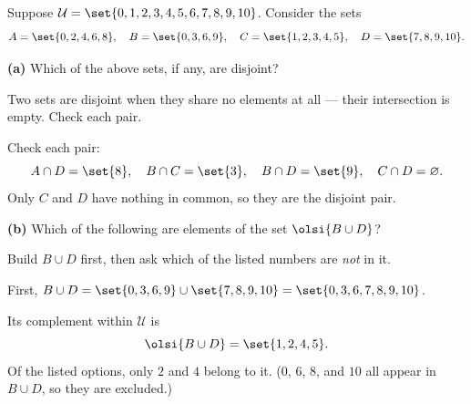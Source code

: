 \documentclass[12pt]{ximera}
\begin{document}
\begin{problem}
Suppose $\mathcal{U}=\set{0,1,2,3,4,5,6,7,8,9,10}$. Consider the sets
\[
A= \set{0,2,4,6,8},\quad B= \set{0,3,6,9},\quad C= \set{1,2,3,4,5},\quad D= \set{7,8,9,10}.
\]

\begin{prompt}
\textbf{(a)} Which of the above sets, if any, are disjoint?

\begin{multipleChoice}
\end{multipleChoice}

\begin{hint}
Two sets are disjoint when they share no elements at all --- their intersection is
empty. Check each pair.
\end{hint}

\begin{feedback}
Check each pair:
\[
A\cap D=\set{8},\quad B\cap C=\set{3},\quad B\cap D=\set{9},\quad C\cap D=\varnothing.
\]
Only $C$ and $D$ have nothing in common, so they are the disjoint pair.
\end{feedback}
\end{prompt}

\begin{prompt}
\textbf{(b)} Which of the following are elements of the set $\olsi{B\cup D}$?

\begin{selectAll}
\end{selectAll}

\begin{hint}
Build $B\cup D$ first, then ask which of the listed numbers are \emph{not} in it.
\end{hint}

\begin{feedback}
First, $B\cup D=\set{0,3,6,9}\cup\set{7,8,9,10}=\set{0,3,6,7,8,9,10}$.

Its complement within $\mathcal{U}$ is
\[ \olsi{B\cup D}=\set{1,2,4,5}. \]
Of the listed options, only $2$ and $4$ belong to it. ($0$, $6$, $8$, and $10$ all
appear in $B\cup D$, so they are excluded.)
\end{feedback}
\end{prompt}
\end{problem}
\end{document}
